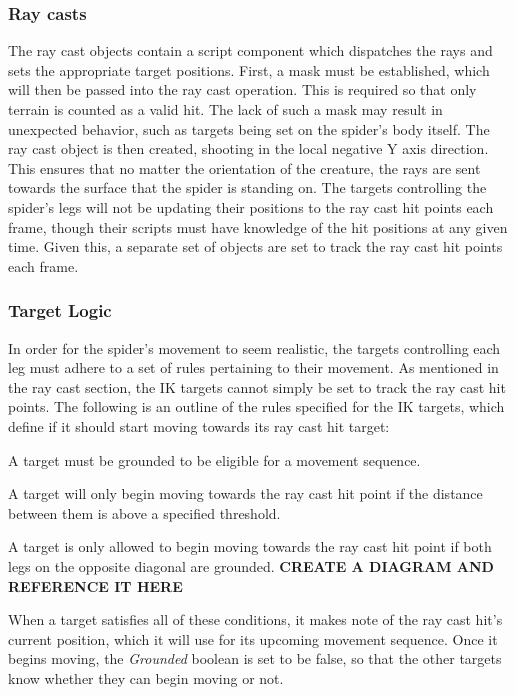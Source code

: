 \subsubsection{Ray casts}
The ray cast objects contain a script component which dispatches the rays and
sets the appropriate target positions. First, a mask must be established, which
will then be passed into the ray cast operation. This is required so that only
terrain is counted as a valid hit. The lack of such a mask may result in
unexpected behavior, such as targets being set on the spider's body itself. The
ray cast object is then created, shooting in the local negative Y axis
direction. This ensures that no matter the orientation of the creature, the rays
are sent towards the surface that the spider is standing on. The targets
controlling the spider's legs will not be updating their positions to the
ray cast hit points each frame, though their scripts must have knowledge of the
hit positions at any given time. Given this, a separate set of objects are set
to track the ray cast hit points each frame.

\subsubsection{Target Logic}
In order for the spider's movement to seem realistic, the targets controlling
each leg must adhere to a set of rules pertaining to their movement. As
mentioned in the ray cast section, the IK targets cannot simply be set to track
the ray cast hit points. The following is an outline of the rules specified for
the IK targets, which define if it should start moving towards its ray cast hit
target:
\itemize
    \item A target must be grounded to be eligible for a movement sequence.

    \item A target will only begin moving towards the ray cast hit point if the
        distance between them is above a specified threshold.

    \item A target is only allowed to begin moving towards the ray cast hit
        point if both legs on the opposite diagonal are grounded.
        \textbf{CREATE A DIAGRAM AND REFERENCE IT HERE}
\enditemize

When a target satisfies all of these conditions, it makes note of the ray cast
hit's current position, which it will use for its upcoming movement sequence.
Once it begins moving, the \textit{Grounded} boolean is set to be false, so that
the other targets know whether they can begin moving or not.


